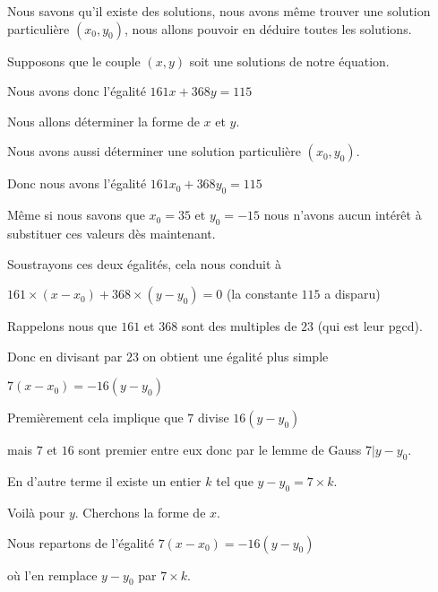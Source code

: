 \diapo

Nous savons qu'il existe des solutions,
nous avons même trouver une solution particulière $(x_0,y_0)$, nous allons pouvoir en
déduire toutes les solutions.

\change

Supposons que le couple  $(x,y)$ soit une solutions de notre équation.

\change

Nous avons donc l'égalité $161 x + 368 y=115$

Nous allons déterminer la forme de $x$ et $y$.

\change

Nous avons aussi déterminer une solution particulière $(x_0,y_0)$.

\change

Donc nous avons l'égalité  $161x_0+368y_0=115$

Même si nous savons que $x_0=35$ et $y_0=-15$ nous 
n'avons aucun intérêt à substituer ces valeurs dès maintenant.

\change 

Soustrayons ces deux égalités,
cela nous conduit à 

 $161 \times (x-x_0) + 368 \times (y-y_0) = 0$ (la constante $115$ a disparu)

\change

Rappelons nous que $161$ et $368$ sont des multiples de $23$ 
(qui est leur pgcd).

\change

Donc en divisant par $23$ on obtient une égalité plus simple

 $7(x-x_0) = -16 (y-y_0)$

\change

Premièrement cela implique que $7$ divise $16(y-y_0)$

\change

mais $7$ et $16$ sont premier entre eux donc 
par le lemme de Gauss $7|y-y_0$.

\change

En d'autre terme il existe un entier $k$ tel que 
$y-y_0 = 7 \times k$.

\change

Voilà pour $y$. Cherchons la forme de $x$.

Nous repartons de l'égalité $7(x-x_0) = -16 (y-y_0)$

\change

où l'en remplace $y-y_0$ par $7\times k$.


